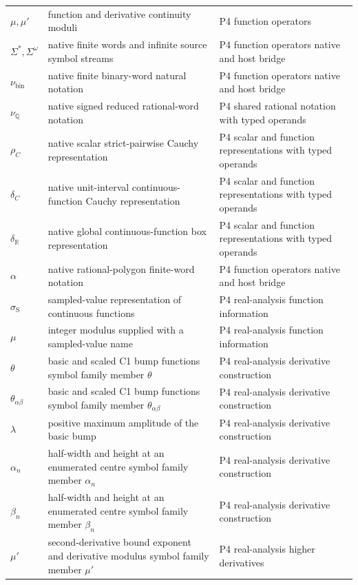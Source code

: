 \begin{longtable}{@{}p{}p{}p{}@{}}
\(\mu,\allowbreak \mu'\) & function and derivative continuity moduli & P4 function operators \\
\(\Sigma^*,\allowbreak \Sigma^\omega\) & native finite words and infinite source symbol streams & P4 function operators native and host bridge \\
\(\nu_{\mathrm{bin}}\) & native finite binary-word natural notation & P4 function operators native and host bridge \\
\(\nu_{\mathbb Q}\) & native signed reduced rational-word notation & P4 shared rational notation with typed operands \\
\(\rho_C\) & native scalar strict-pairwise Cauchy representation & P4 scalar and function representations with typed operands \\
\(\delta_C\) & native unit-interval continuous-function Cauchy representation & P4 scalar and function representations with typed operands \\
\(\delta_{\mathbb R}\) & native global continuous-function box representation & P4 scalar and function representations with typed operands \\
\(\alpha\) & native rational-polygon finite-word notation & P4 function operators native and host bridge \\
\(\sigma_{\mathrm S}\) & sampled-value representation of continuous functions & P4 real-\allowbreak{}analysis function information \\
\(\mu\) & integer modulus supplied with a sampled-value name & P4 real-\allowbreak{}analysis function information \\
\(\theta\) & basic and scaled C1 bump functions symbol family member \(\theta\) & P4 real-\allowbreak{}analysis derivative construction \\
\(\theta_{\alpha\beta}\) & basic and scaled C1 bump functions symbol family member \(\theta_{\alpha\beta}\) & P4 real-\allowbreak{}analysis derivative construction \\
\(\lambda\) & positive maximum amplitude of the basic bump & P4 real-\allowbreak{}analysis derivative construction \\
\(\alpha_n\) & half-width and height at an enumerated centre symbol family member \(\alpha_n\) & P4 real-\allowbreak{}analysis derivative construction \\
\(\beta_n\) & half-width and height at an enumerated centre symbol family member \(\beta_n\) & P4 real-\allowbreak{}analysis derivative construction \\
\(\mu'\) & second-derivative bound exponent and derivative modulus symbol family member \(\mu'\) & P4 real-\allowbreak{}analysis higher derivatives \\

\end{longtable}
